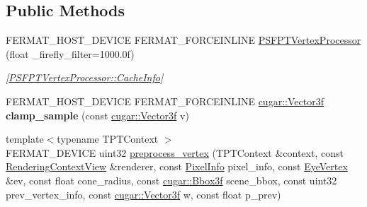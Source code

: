 \subsection*{Public Methods}
\begin{DoxyCompactItemize}
\item 
\mbox{\label{struct_p_s_f_p_t_vertex_processor_ad6c0aaa37ae1f5fa043d4f0f62d6b3be}} 
F\+E\+R\+M\+A\+T\+\_\+\+H\+O\+S\+T\+\_\+\+D\+E\+V\+I\+CE F\+E\+R\+M\+A\+T\+\_\+\+F\+O\+R\+C\+E\+I\+N\+L\+I\+NE \hyperlink{struct_p_s_f_p_t_vertex_processor_ad6c0aaa37ae1f5fa043d4f0f62d6b3be}{P\+S\+F\+P\+T\+Vertex\+Processor} (float \+\_\+firefly\+\_\+filter=1000.\+0f)
\begin{DoxyCompactList}\small\item\em \mbox{[}\hyperlink{union_p_s_f_p_t_vertex_processor_1_1_cache_info}{P\+S\+F\+P\+T\+Vertex\+Processor\+::\+Cache\+Info}\mbox{]} \end{DoxyCompactList}\item 
\mbox{\label{struct_p_s_f_p_t_vertex_processor_ad21b3e69bd4affa9d2d71b56e22f4fed}} 
F\+E\+R\+M\+A\+T\+\_\+\+H\+O\+S\+T\+\_\+\+D\+E\+V\+I\+CE F\+E\+R\+M\+A\+T\+\_\+\+F\+O\+R\+C\+E\+I\+N\+L\+I\+NE \hyperlink{structcugar_1_1_vector}{cugar\+::\+Vector3f} {\bfseries clamp\+\_\+sample} (const \hyperlink{structcugar_1_1_vector}{cugar\+::\+Vector3f} v)
\item 
{\footnotesize template$<$typename T\+P\+T\+Context $>$ }\\F\+E\+R\+M\+A\+T\+\_\+\+D\+E\+V\+I\+CE uint32 \hyperlink{struct_p_s_f_p_t_vertex_processor_ae26801cfa7d5de8979979419f5edc934}{preprocess\+\_\+vertex} (T\+P\+T\+Context \&context, const \hyperlink{struct_rendering_context_view}{Rendering\+Context\+View} \&renderer, const \hyperlink{union_pixel_info}{Pixel\+Info} pixel\+\_\+info, const \hyperlink{struct_eye_vertex}{Eye\+Vertex} \&ev, const float cone\+\_\+radius, const \hyperlink{structcugar_1_1_bbox}{cugar\+::\+Bbox3f} scene\+\_\+bbox, const uint32 prev\+\_\+vertex\+\_\+info, const \hyperlink{structcugar_1_1_vector}{cugar\+::\+Vector3f} w, const float p\+\_\+prev)
\item 

\end{DoxyCompactItemize}
